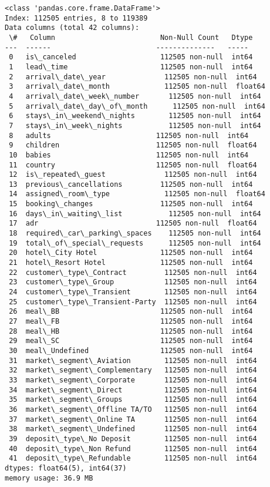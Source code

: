 \documentclass[11pt]{article}
\begin{document}
    \begin{Verbatim}[commandchars=\\\{\}]
<class 'pandas.core.frame.DataFrame'>
Index: 112505 entries, 8 to 119389
Data columns (total 42 columns):
 \#   Column                         Non-Null Count   Dtype
---  ------                         --------------   -----
 0   is\_canceled                    112505 non-null  int64
 1   lead\_time                      112505 non-null  int64
 2   arrival\_date\_year              112505 non-null  int64
 3   arrival\_date\_month             112505 non-null  float64
 4   arrival\_date\_week\_number       112505 non-null  int64
 5   arrival\_date\_day\_of\_month      112505 non-null  int64
 6   stays\_in\_weekend\_nights        112505 non-null  int64
 7   stays\_in\_week\_nights           112505 non-null  int64
 8   adults                         112505 non-null  int64
 9   children                       112505 non-null  float64
 10  babies                         112505 non-null  int64
 11  country                        112505 non-null  float64
 12  is\_repeated\_guest              112505 non-null  int64
 13  previous\_cancellations         112505 non-null  int64
 14  assigned\_room\_type             112505 non-null  float64
 15  booking\_changes                112505 non-null  int64
 16  days\_in\_waiting\_list           112505 non-null  int64
 17  adr                            112505 non-null  float64
 18  required\_car\_parking\_spaces    112505 non-null  int64
 19  total\_of\_special\_requests      112505 non-null  int64
 20  hotel\_City Hotel               112505 non-null  int64
 21  hotel\_Resort Hotel             112505 non-null  int64
 22  customer\_type\_Contract         112505 non-null  int64
 23  customer\_type\_Group            112505 non-null  int64
 24  customer\_type\_Transient        112505 non-null  int64
 25  customer\_type\_Transient-Party  112505 non-null  int64
 26  meal\_BB                        112505 non-null  int64
 27  meal\_FB                        112505 non-null  int64
 28  meal\_HB                        112505 non-null  int64
 29  meal\_SC                        112505 non-null  int64
 30  meal\_Undefined                 112505 non-null  int64
 31  market\_segment\_Aviation        112505 non-null  int64
 32  market\_segment\_Complementary   112505 non-null  int64
 33  market\_segment\_Corporate       112505 non-null  int64
 34  market\_segment\_Direct          112505 non-null  int64
 35  market\_segment\_Groups          112505 non-null  int64
 36  market\_segment\_Offline TA/TO   112505 non-null  int64
 37  market\_segment\_Online TA       112505 non-null  int64
 38  market\_segment\_Undefined       112505 non-null  int64
 39  deposit\_type\_No Deposit        112505 non-null  int64
 40  deposit\_type\_Non Refund        112505 non-null  int64
 41  deposit\_type\_Refundable        112505 non-null  int64
dtypes: float64(5), int64(37)
memory usage: 36.9 MB
    \end{Verbatim}
\end{document}

